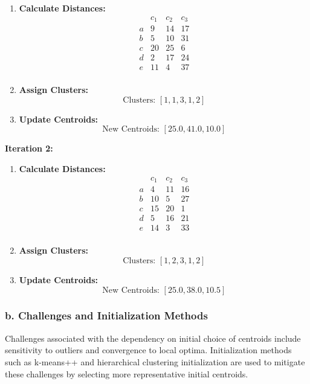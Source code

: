 \documentclass{article}
\begin{document}
\begin{enumerate}
    \item \textbf{Calculate Distances:}
    \[
    \begin{array}{c|ccc}
    & c_1 & c_2 & c_3 \\
    \hline
    a & 9 & 14 & 17 \\
    b & 5 & 10 & 31 \\
    c & 20 & 25 & 6 \\
    d & 2 & 17 & 24 \\
    e & 11 & 4 & 37 \\
    \end{array}
    \]
    
    \item \textbf{Assign Clusters:}
    \[
    \text{Clusters: } [1, 1, 3, 1, 2]
    \]
    
    \item \textbf{Update Centroids:}
    \[
    \text{New Centroids: } [25.0, 41.0, 10.0]
    \]
\end{enumerate}

\textbf{Iteration 2:}

\begin{enumerate}
    \item \textbf{Calculate Distances:}
    \[
    \begin{array}{c|ccc}
    & c_1 & c_2 & c_3 \\
    \hline
    a & 4 & 11 & 16 \\
    b & 10 & 5 & 27 \\
    c & 15 & 20 & 1 \\
    d & 5 & 16 & 21 \\
    e & 14 & 3 & 33 \\
    \end{array}
    \]
    
    \item \textbf{Assign Clusters:}
    \[
    \text{Clusters: } [1, 2, 3, 1, 2]
    \]
    
    \item \textbf{Update Centroids:}
    \[
    \text{New Centroids: } [25.0, 38.0, 10.5]
    \]
\end{enumerate}


\subsubsection*{b. Challenges and Initialization Methods}

Challenges associated with the dependency on initial choice of centroids include sensitivity to outliers and convergence to local optima. Initialization methods such as k-means++ and hierarchical clustering initialization are used to mitigate these challenges by selecting more representative initial centroids.
\end{document}
